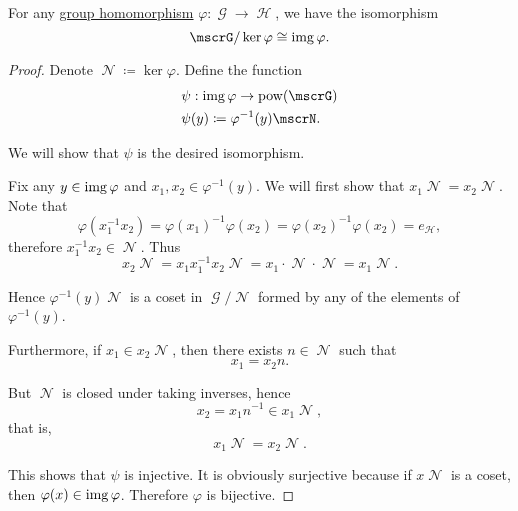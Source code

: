 \begin{theorem}\label{thm:homomorphism_theorem_for_groups}
  For any \hyperref[def:group/homomorphism]{group homomorphism} \( \varphi: \mscrG \to \mscrH \), we have the isomorphism
  \begin{equation*}
    \mscrG / \ker \varphi \cong \img \varphi.
  \end{equation*}
\end{theorem}
\begin{proof}
  Denote \( \mscrN \coloneqq \ker \varphi \). Define the function
  \begin{align*}
    &\psi: \img \varphi \to \pow(\mscrG) \\
    &\psi(y) \coloneqq \varphi^{-1}(y) \mscrN.
  \end{align*}

  We will show that \( \psi \) is the desired isomorphism.

  Fix any \( y \in \operatorname{img} \varphi \) and \( x_1, x_2 \in \varphi^{-1}(y) \). We will first show that \( x_1 \mscrN = x_2 \mscrN \). Note that
  \begin{equation*}
    \varphi(x_1^{-1} x_2)
    =
    \varphi(x_1)^{-1} \varphi(x_2)
    =
    \varphi(x_2)^{-1} \varphi(x_2)
    =
    e_{\mscrH},
  \end{equation*}
  therefore \( x_1^{-1} x_2 \in \mscrN \). Thus
  \begin{equation*}
    x_2 \mscrN = x_1 x_1^{-1} x_2 \mscrN = x_1 \cdot \mscrN \cdot \mscrN = x_1 \mscrN.
  \end{equation*}

  Hence \( \varphi^{-1}(y) \mscrN \) is a coset in \( \mscrG / \mscrN \) formed by any of the elements of \( \varphi^{-1}(y) \).

  Furthermore, if \( x_1 \in x_2 \mscrN \), then there exists \( n \in \mscrN \) such that
  \begin{equation*}
    x_1 = x_2 n.
  \end{equation*}

  But \( \mscrN \) is closed under taking inverses, hence
  \begin{equation*}
    x_2 = x_1 n^{-1} \in x_1 \mscrN,
  \end{equation*}
  that is,
  \begin{equation*}
    x_1 \mscrN = x_2 \mscrN.
  \end{equation*}

  This shows that \( \psi \) is injective. It is obviously surjective because if \( x \mscrN \) is a coset, then \( \varphi(x) \in \operatorname{img} \varphi \). Therefore \( \varphi \) is bijective.


\end{proof}
